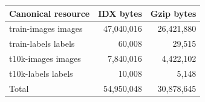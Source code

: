 \begin{tabular}{lrr}
\toprule
Canonical resource & IDX bytes & Gzip bytes \\
\midrule
train-images images & 47,040,016 & 26,421,880 \\
train-labels labels & 60,008 & 29,515 \\
t10k-images images & 7,840,016 & 4,422,102 \\
t10k-labels labels & 10,008 & 5,148 \\
Total & 54,950,048 & 30,878,645 \\
\bottomrule
\end{tabular}
